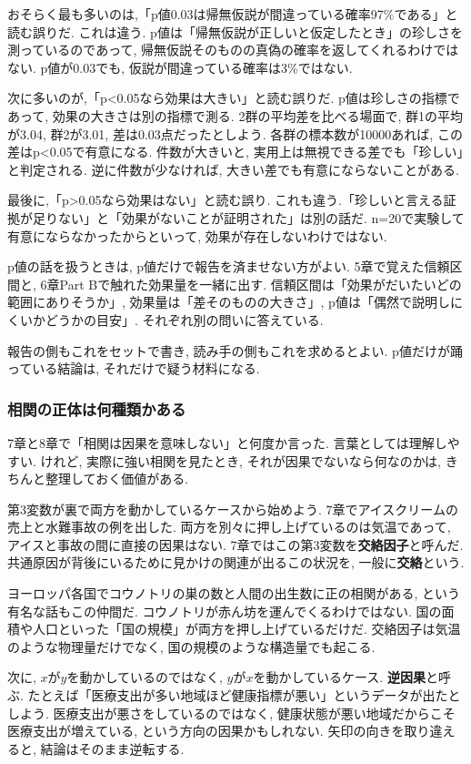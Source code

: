 おそらく最も多いのは,「p値0.03は帰無仮説が間違っている確率97\%である」と読む誤りだ.
これは違う. p値は「帰無仮説が正しいと仮定したとき」の珍しさを測っているのであって, 帰無仮説そのものの真偽の確率を返してくれるわけではない.
p値が0.03でも, 仮説が間違っている確率は3\%ではない.

次に多いのが,「p<0.05なら効果は大きい」と読む誤りだ.
p値は珍しさの指標であって, 効果の大きさは別の指標で測る.
2群の平均差を比べる場面で, 群1の平均が3.04, 群2が3.01, 差は0.03点だったとしよう.
各群の標本数が10000あれば, この差はp<0.05で有意になる.
件数が大きいと, 実用上は無視できる差でも「珍しい」と判定される.
逆に件数が少なければ, 大きい差でも有意にならないことがある.

最後に,「p>0.05なら効果はない」と読む誤り.
これも違う.「珍しいと言える証拠が足りない」と「効果がないことが証明された」は別の話だ.
n=20で実験して有意にならなかったからといって, 効果が存在しないわけではない.

p値の話を扱うときは, p値だけで報告を済ませない方がよい.
5章で覚えた信頼区間と, 6章Part Bで触れた効果量を一緒に出す.
信頼区間は「効果がだいたいどの範囲にありそうか」, 効果量は「差そのものの大きさ」, p値は「偶然で説明しにくいかどうかの目安」.
それぞれ別の問いに答えている.

報告の側もこれをセットで書き, 読み手の側もこれを求めるとよい.
p値だけが踊っている結論は, それだけで疑う材料になる.

\subsubsection*{相関の正体は何種類かある}

7章と8章で「相関は因果を意味しない」と何度か言った.
言葉としては理解しやすい. けれど, 実際に強い相関を見たとき, それが因果でないなら何なのかは, きちんと整理しておく価値がある.

第3変数が裏で両方を動かしているケースから始めよう. 7章でアイスクリームの売上と水難事故の例を出した. 両方を別々に押し上げているのは気温であって, アイスと事故の間に直接の因果はない. 7章ではこの第3変数を\textbf{交絡因子}と呼んだ. 共通原因が背後にいるために見かけの関連が出るこの状況を, 一般に\textbf{交絡}という.

ヨーロッパ各国でコウノトリの巣の数と人間の出生数に正の相関がある, という有名な話もこの仲間だ.
コウノトリが赤ん坊を運んでくるわけではない. 国の面積や人口といった「国の規模」が両方を押し上げているだけだ.
交絡因子は気温のような物理量だけでなく, 国の規模のような構造量でも起こる.

次に, $x$が$y$を動かしているのではなく, $y$が$x$を動かしているケース. \textbf{逆因果}と呼ぶ.
たとえば「医療支出が多い地域ほど健康指標が悪い」というデータが出たとしよう.
医療支出が悪さをしているのではなく, 健康状態が悪い地域だからこそ医療支出が増えている, という方向の因果かもしれない.
矢印の向きを取り違えると, 結論はそのまま逆転する.

